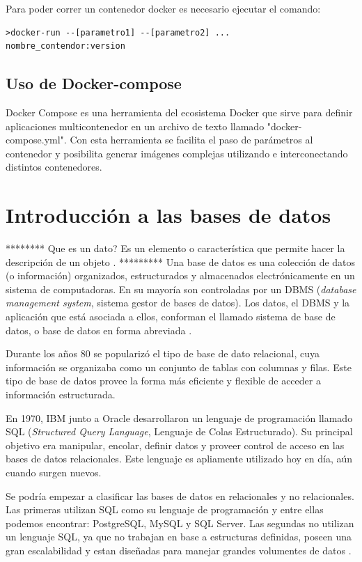 Para poder correr un contenedor docker es necesario ejecutar el comando:
\begin{lstlisting}[label=docker:vControl,caption=Ejecución de contenedor.]  
>docker-run --[parametro1] --[parametro2] ...
nombre_contendor:version
\end{lstlisting}


\subsection{Uso de Docker-compose}
\label{subsec:Docker-compose}

Docker Compose es una herramienta del ecosistema Docker que sirve para definir aplicaciones multicontenedor en un archivo de texto llamado "docker-compose.yml". 
Con esta herramienta se facilita el paso de parámetros al contenedor y posibilita generar imágenes complejas utilizando e interconectando distintos contenedores.

 

\section{Introducción a las bases de datos}
\label{sec: Introducción a las bases de datos}
********
Que es un dato? Es un elemento o característica que permite hacer la descripción de un objeto \citep{WEBSITE:12}.
*********
Una base de datos es una colección de datos (o información) organizados, estructurados y almacenados electrónicamente en un sistema de computadoras. En su mayoría son controladas por un DBMS (\textit{database management system}, sistema gestor de bases de datos). Los datos, el DBMS y la aplicación que está asociada a ellos, conforman el llamado sistema de base de datos, o base de datos en forma abreviada \citep{WEBSITE:11}.

Durante los años 80 se popularizó el tipo de base de dato relacional, cuya información se organizaba como un conjunto de tablas con columnas y filas. Este tipo de base de datos provee la forma más eficiente y flexible de acceder a información estructurada.

En 1970, IBM junto a Oracle desarrollaron un lenguaje de programación llamado SQL (\textit{Structured Query Language}, Lenguaje de Colas Estructurado). Su principal objetivo era manipular, encolar, definir datos y proveer control de acceso en las bases de datos relacionales. Este lenguaje es apliamente utilizado hoy en día, aún cuando surgen nuevos.

Se podría empezar a clasificar las bases de datos en relacionales y no relacionales. Las primeras utilizan SQL como su lenguaje de programación y entre ellas podemos encontrar: PostgreSQL, MySQL y SQL Server. Las segundas no utilizan un lenguaje SQL, ya que no trabajan en base a estructuras definidas, poseen una gran escalabilidad y estan diseñadas para manejar grandes volumentes de datos \citep{WEBSITE:12}.


